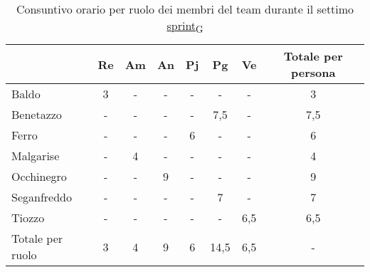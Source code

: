\begin{table}[!h]
    \centering
    \begin{tabular}{ | l | c | c | c | c | c | c | c | }
        \hline
        \textbf{} & \textbf{Re} & \textbf{Am} &\textbf{An} & \textbf{Pj} & \textbf{Pg} & \textbf{Ve} & \textbf{Totale per persona} \\
        \hline
        Baldo            &  3   &  -   &  -   &  -   &  -   &  -   &  3   \\
        Benetazzo        &  -   &  -   &  -   &  -   &  7,5 &  -   &  7,5 \\
        Ferro            &  -   &  -   &  -   &  6   &  -   &  -   &  6   \\
        Malgarise        &  -   &  4   &  -   &  -   &  -   &  -   &  4   \\
        Occhinegro       &  -   &  -   &  9   &  -   &  -   &  -   &  9   \\
        Seganfreddo      &  -   &  -   &  -   &  -   &  7   &  -   &  7   \\
        Tiozzo           &  -   &  -   &  -   &  -   &  -   &  6,5 &  6,5 \\
        \hline
        Totale per ruolo &  3   &  4   &  9   &  6   & 14,5 &  6,5  &  -  \\
        \hline
    \end{tabular}
    \caption{Consuntivo orario per ruolo dei membri del team durante il settimo \href{https://7last.github.io/docs/rtb/documentazione-interna/glossario\#sprint}{sprint\textsubscript{G}}}
\end{table}

